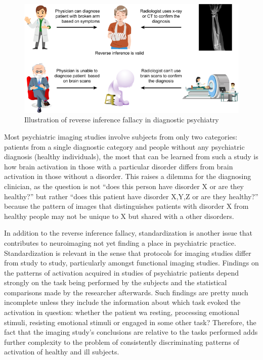 ﻿\documentclass[12pt]{article}
\begin{document}
\begin{figure}[H]
  \centering
  \includegraphics[width=\textwidth]{reverse-inference.png}
  \caption{Illustration of reverse inference fallacy in diagnostic
  psychiatry}
\end{figure}

Most psychiatric imaging studies involve subjects from only two
categories: patients from a single diagnostic category and people
without any psychiatric diagnosis (healthy individuals), the most that
can be learned from such a study is how brain activation in those with
a particular disorder differs from brain activation in those without
a disorder. This raises a dilemma for the diagnosing clinician, as the
question is not ``does this person have disorder X or are they
healthy?'' but rather ``does this patient have disorder X,Y,Z or are
they healthy?'' because the pattern of images that distinguishes
patients with disorder X from healthy people may not be unique to
X but shared with a other disorders.

In addition to the reverse inference fallacy, standardization is
another issue that contributes to neuroimaging not yet finding
a place in psychiatric practice. Standardization is relevant in the
sense that protocols for imaging studies differ from study to study,
particularly amongst functional imaging studies. Findings on the
patterns of activation acquired in studies of psychiatric patients
depend strongly on the task being performed by the subjects and the
statistical comparisons made by the researcher afterwards. Such
findings are pretty much incomplete unless they include the
information about which task evoked the activation in question:
whether the patient wa resting, processing emotional stimuli,
resisting emotional stimuli or engaged in some other task? Therefore,
the fact that the imaging study’s conclusions are relative to the
tasks performed adds further complexity to the problem of consistently
discriminating patterns of activation of healthy and ill subjects.
\end{document}
